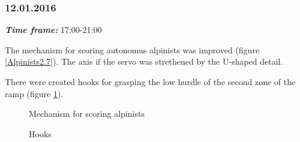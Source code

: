 \subsubsection{12.01.2016}
\textit{\textbf{Time frame:}} 17:00-21:00

The mechanism for scoring autonomus alpinists was improved (figure \ref{Alpinists2.7}). The axis if the servo was strethened by the U-shaped detail.

There were created hooks for grasping the low hurdle of the second zone of the ramp (figure \ref{Hooks1.1}).

\begin{figure}[H]
	\begin{minipage}[h]{0.47\linewidth}
		\caption{Mechanism for scoring alpinists}
		\label{Alpinists2.7}
	\end{minipage}
	\hfill
	\begin{minipage}[h]{0.47\linewidth}
		\caption{Hooks}
		\label{Hooks1.1}
	\end{minipage}
\end{figure}
